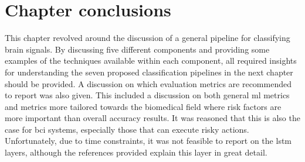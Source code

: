 \section{Chapter conclusions}
\label{sec:processing_signals_summary}

This chapter revolved around the discussion of a general pipeline for classifying brain signals.
By discussing five different components and providing some examples of the techniques available within each component, all required insights for understanding the seven proposed classification pipelines in the next chapter should be provided.
A discussion on which evaluation metrics are recommended to report was also given.
This included a discussion on both general \gls{ml} metrics and metrics more tailored towards the biomedical field where risk factors are more important than overall accuracy results.
It was reasoned that this is also the case for \gls{bci} systems, especially those that can execute risky actions.
Unfortunately, due to time constraints, it was not feasible to report on the \gls{lstm} layers, although the references provided explain this layer in great detail.